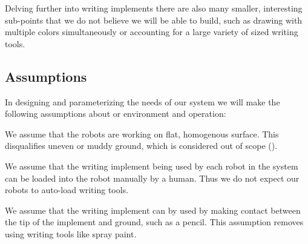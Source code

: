 Delving further into writing implements there are also many smaller, interesting sub-points that we do not believe we will be able to build, such as drawing with multiple colors simultaneously or accounting for a large variety of sized writing tools. 

\subsection{Assumptions}
\label{sec:assumptions}

In designing and parameterizing the needs of our system we will make the following assumptions about or environment and operation: 
\begin{list}{A:~}{}
\item {} 
\item {}  
\item We assume that the robots are working on flat, homogenous surface. This disqualifies uneven or muddy ground, which is considered out of scope ().
\item We assume that the writing implement being used by each robot in the system can be loaded into the robot manually by a human. Thus we do not expect our robots to auto-load writing tools. 
\item We assume that the writing implement can by used by making contact between the tip of the implement and ground, such as a pencil. This assumption removes using writing tools like spray paint.
\end{list}